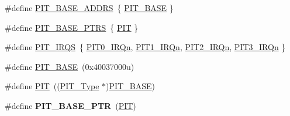 \begin{DoxyCompactItemize}
\item 
\#define \hyperlink{group__PIT__Peripheral__Access__Layer_ga79085fa95893e4423661373b7be2f0a7}{P\+I\+T\+\_\+\+B\+A\+S\+E\+\_\+\+A\+D\+D\+RS}~\{ \hyperlink{group__PIT__Peripheral__Access__Layer_gaf00b86ba33a2cfe7bb100b4f01905f41}{P\+I\+T\+\_\+\+B\+A\+SE} \}
\item 
\#define \hyperlink{group__PIT__Peripheral__Access__Layer_ga403e0ed71b80cfe3e085fe6b56b5eff0}{P\+I\+T\+\_\+\+B\+A\+S\+E\+\_\+\+P\+T\+RS}~\{ \hyperlink{group__PIT__Peripheral__Access__Layer_gaf181c9e6602b6432a0bf1a9243808968}{P\+IT} \}
\item 
\#define \hyperlink{group__PIT__Peripheral__Access__Layer_ga5f0ae6317a2c8c12e46e49c6e2e29dda}{P\+I\+T\+\_\+\+I\+R\+QS}~\{ \hyperlink{group__Interrupt__vector__numbers_gga666eb0caeb12ec0e281415592ae89083ab3bc681f165a0965ac922a33bcc466c3}{P\+I\+T0\+\_\+\+I\+R\+Qn}, \hyperlink{group__Interrupt__vector__numbers_gga666eb0caeb12ec0e281415592ae89083aebde56c1a0c87a74c43fc8b35309d429}{P\+I\+T1\+\_\+\+I\+R\+Qn}, \hyperlink{group__Interrupt__vector__numbers_gga666eb0caeb12ec0e281415592ae89083afdef24d623050c63c2c35eb54dd35caf}{P\+I\+T2\+\_\+\+I\+R\+Qn}, \hyperlink{group__Interrupt__vector__numbers_gga666eb0caeb12ec0e281415592ae89083aa6195cc174d28b297fe7652bf1663311}{P\+I\+T3\+\_\+\+I\+R\+Qn} \}
\item 
\#define \hyperlink{group__PIT__Peripheral__Access__Layer_gaf00b86ba33a2cfe7bb100b4f01905f41}{P\+I\+T\+\_\+\+B\+A\+SE}~(0x40037000u)
\item 
\#define \hyperlink{group__PIT__Peripheral__Access__Layer_gaf181c9e6602b6432a0bf1a9243808968}{P\+IT}~((\hyperlink{structPIT__Type}{P\+I\+T\+\_\+\+Type} $\ast$)\hyperlink{group__PIT__Peripheral__Access__Layer_gaf00b86ba33a2cfe7bb100b4f01905f41}{P\+I\+T\+\_\+\+B\+A\+SE})
\item 
\#define {\bfseries P\+I\+T\+\_\+\+B\+A\+S\+E\+\_\+\+P\+TR}~(\hyperlink{group__PIT__Peripheral__Access__Layer_gaf181c9e6602b6432a0bf1a9243808968}{P\+IT})\hypertarget{group__PIT__Peripheral__Access__Layer_ga70be45f58402a8e6d2ce4df7b23aa41c}{}\label{group__PIT__Peripheral__Access__Layer_ga70be45f58402a8e6d2ce4df7b23aa41c}


\end{DoxyCompactItemize}
